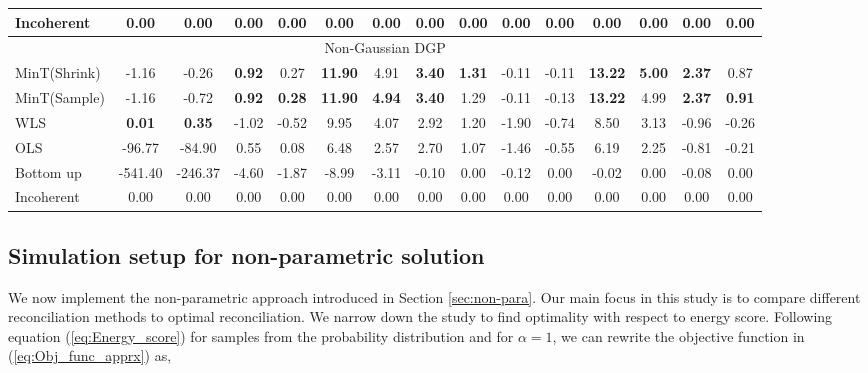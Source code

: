 \documentclass[12pt]{article}
\theoremstyle{definition}
\begin{document}
\begin{table}[H]
{\begin{tabular}{lcccccccccccccc}
			Incoherent & 0.00 & 0.00 & 0.00 & 0.00 & 0.00 & 0.00  & 0.00 & 0.00 & 0.00 & 0.00 & 0.00 & 0.00 & 0.00 & 0.00 \\
			
			\toprule
			\multicolumn{15}{c}{Non-Gaussian DGP}\\
			\toprule
			
			MinT(Shrink) & -1.16 & -0.26 & \textbf{0.92} & 0.27 & \textbf{11.90} & 4.91 & \textbf{3.40} & \textbf{1.31} & -0.11 & -0.11 & \textbf{13.22} & \textbf{5.00} & \textbf{2.37} & 0.87 \\
			
			MinT(Sample) & -1.16 & -0.72 & \textbf{0.92} & \textbf{0.28} & \textbf{11.90} & \textbf{4.94} & \textbf{3.40} & 1.29 & -0.11 & -0.13 & \textbf{13.22} & 4.99 & \textbf{2.37} & \textbf{0.91}\\
			
			WLS & \textbf{0.01} & \textbf{0.35} & -1.02 & -0.52 & 9.95 & 4.07 & 2.92 & 1.20 & -1.90 & -0.74 & 8.50 & 3.13 & -0.96 & -0.26\\
			
			OLS & -96.77 & -84.90 & 0.55 & 0.08 & 6.48 & 2.57 & 2.70 & 1.07 & -1.46 & -0.55 & 6.19 & 2.25 & -0.81 & -0.21\\
			
			Bottom up & -541.40 & -246.37 & -4.60 & -1.87 & -8.99 & -3.11 & -0.10 & 0.00 & -0.12 & 0.00 & -0.02 & 0.00 & -0.08 & 0.00 \\
			
			Incoherent & 0.00 & 0.00 & 0.00 & 0.00 & 0.00 & 0.00 & 0.00 & 0.00 & 0.00 & 0.00 & 0.00 & 0.00 & 0.00 & 0.00 \\
			\bottomrule
		\end{tabular}
	}
\end{table}


\subsection{Simulation setup for non-parametric solution}\label{sec:Bootsrap-sim}

We now implement the non-parametric approach introduced in Section \ref{sec:non-para}. Our main focus in this study is to compare different reconciliation methods to optimal reconciliation. We narrow down the study to find optimality with respect to energy score. Following equation (\ref{eq:Energy_score}) for samples from the probability distribution and for $\alpha = 1$, we can rewrite the objective function in (\ref{eq:Obj_func_apprx}) as,
\end{document}
